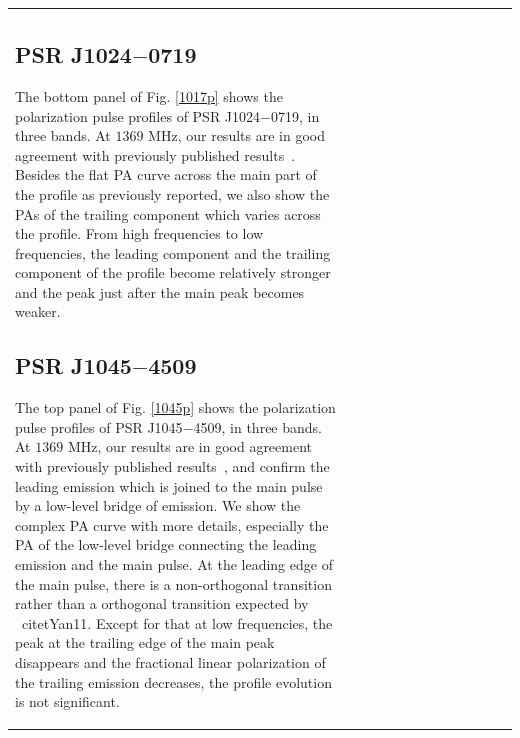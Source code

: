 \documentclass[useAMS,usenatbib]{mn2e}
\begin{document}
\begin{table}
\begin{center}
\begin{tabular}{lcccccccccccc}
%


%
\subsection{PSR J1024$-$0719}

The bottom panel of Fig. \ref{1017p} shows the polarization pulse profiles of 
PSR J1024$-$0719, in three bands.
%
At $1369$ MHz, our results are in good agreement with previously published
results~\citep{Ord04,Yan11}. 
%
Besides the flat PA curve across the main part of the profile as 
previously reported, we also show the PAs of the trailing component which 
varies across the profile.
%
From high frequencies to low frequencies, the leading component and the 
trailing component of the profile become relatively stronger and the peak 
just after the main peak becomes weaker.



%
\subsection{PSR J1045$-$4509}

The top panel of Fig. \ref{1045p} shows the polarization pulse profiles of 
PSR J1045$-$4509, in three bands.
%
At $1369$ MHz, our results are in good agreement with previously published
results~\citep{Yan11}, and confirm the leading emission which is joined to 
the main pulse by a low-level bridge of emission.
%
We show the complex PA curve with more details, especially the PA of the 
low-level bridge connecting the leading emission and the main pulse.
%
At the leading edge of the main pulse, there is a non-orthogonal transition 
rather than a orthogonal transition expected by ~citet{Yan11}.
%
Except for that at low frequencies, the peak at the trailing edge of the 
main peak disappears and the fractional linear polarization of the trailing 
emission decreases, the profile evolution is not significant.


\end{tabular}
\end{center}
\end{table}
\end{document}
